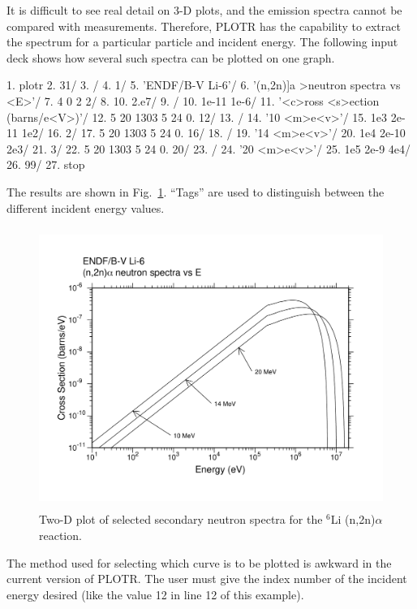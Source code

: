 It is difficult to see real detail on 3-D plots, and the emission
spectra cannot be compared with measurements.  Therefore, PLOTR has
the capability to extract the spectrum for a particular particle
and incident energy.  The following input deck shows how several
such spectra can be plotted on one graph.

\small
\begin{ccode}

   1.  plotr
   2.  31/
   3.  /
   4.  1/
   5.  'ENDF/B-V Li-6'/
   6.  '(n,2n)]a >neutron spectra vs <E>'/
   7.  4 0 2 2/
   8.  10. 2.e7/
   9.  /
  10.  1e-11 1e-6/
  11.  '<c>ross <s>ection (barns/e<V>)'/
  12.  5 20 1303 5 24 0. 12/
  13.  /
  14.  '10 <m>e<v>'/
  15.  1e3 2e-11 1e2/
  16.  2/
  17.  5 20 1303 5 24 0. 16/
  18.  /
  19.  '14 <m>e<v>'/
  20.  1e4 2e-10 2e3/
  21.  3/
  22.  5 20 1303 5 24 0. 20/
  23.  /
  24.  '20 <m>e<v>'/
  25.  1e5 2e-9 4e4/
  26.  99/
  27.  stop

\end{ccode}
\normalsize

\noindent
The results are shown in Fig.~\ref{spec}.  ``Tags'' are used to
distinguish between the different incident energy values.

\begin{figure}[t]\centering
\includegraphics[keepaspectratio, height=3.6in, angle=0]{figs/plotr10ack}
\caption[Sample 2-D plot of neutron secondary-energy distribution data]
{Two-D plot of selected secondary neutron spectra for the
 $^{6}$Li (n,2n)$\alpha$ reaction.}
\label{spec}
\end{figure}

The method used for selecting which curve is to be plotted
is awkward in the current version of PLOTR.  The user must give
the index number of the incident energy desired (like the value
12 in line 12 of this example).

